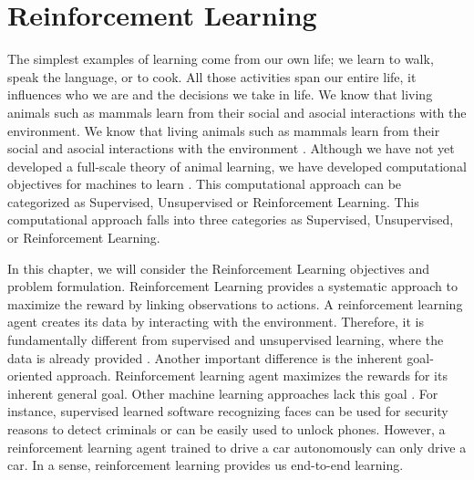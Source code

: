 
\section{Reinforcement Learning}

The simplest examples of learning come from our own life; we learn to walk, speak the language, or to cook. All those activities span our entire life, it influences who we are and the decisions we take in life. We know that living animals such as mammals learn from their social and asocial interactions with the environment.
We know that living animals such as mammals learn from their social and asocial interactions with the environment \cite{AnimalInt11}. 
Although we have not yet developed a full-scale theory of animal learning, we have developed computational objectives for machines to learn \cite{Sutton2018}. 
This computational approach can be categorized as Supervised, Unsupervised or Reinforcement Learning. This computational approach falls into three categories as Supervised, Unsupervised, or Reinforcement Learning.

In this chapter, we will consider the Reinforcement Learning objectives and problem formulation.
Reinforcement Learning provides a systematic approach to maximize the reward by linking observations to actions. A reinforcement learning agent creates its data by interacting with the environment. Therefore, it is fundamentally different from supervised and unsupervised learning, where the data is already provided \cite{Sutton2018}. 
Another important difference is the inherent goal-oriented approach. Reinforcement learning agent maximizes the rewards for its inherent general goal. Other machine learning approaches lack this goal \cite{Sutton2018}.
For instance, supervised learned software recognizing faces can be used for security reasons to detect criminals or can be easily used to unlock phones. However, a reinforcement learning agent trained to drive a car autonomously can only drive a car. In a sense, reinforcement learning provides us end-to-end learning.

